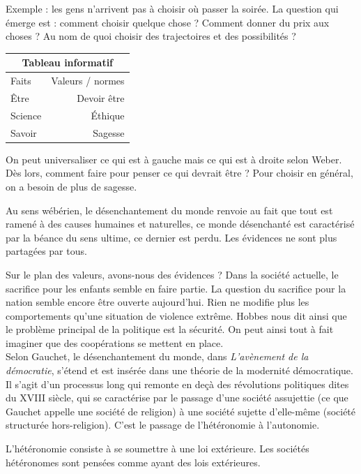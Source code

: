 \documentclass[a4paper,11pt]{article}
\begin{document}
	Exemple : les gens n’arrivent pas à choisir où passer la soirée. La question qui émerge est : comment choisir quelque chose ? Comment donner du prix aux choses ? Au nom de quoi choisir des trajectoires et des possibilités ?

	\vspace{0.3cm}
	\begin{tabular}{lr}
	\multicolumn{2}{c}{Tableau informatif} \\
	\hline
	Faits & Valeurs / normes \\
	Être & Devoir être \\
	Science & Éthique \\
	Savoir & Sagesse
	\end{tabular}
	\vspace{0.3cm}

	On peut universaliser ce qui est à gauche mais ce qui est à droite selon Weber. Dès lors, comment faire pour penser ce qui devrait être ? Pour choisir en général, on a besoin de plus de sagesse.
	
	Au sens wébérien, le désenchantement du monde renvoie au fait que tout est ramené à des causes humaines et naturelles, ce monde désenchanté est caractérisé par la béance du sens ultime, ce dernier est perdu. Les évidences ne sont plus partagées par tous.
	
	Sur le plan des valeurs, avons-nous des évidences ? Dans la société actuelle, le sacrifice pour les enfants semble en faire partie.
	La question du sacrifice pour la nation semble encore être ouverte aujourd’hui.
	Rien ne modifie plus les comportements qu’une situation de violence extrême. Hobbes nous dit ainsi que le problème principal de la politique est la sécurité.
	On peut ainsi tout à fait imaginer que des coopérations se mettent en place.\\
	
	Selon Gauchet, le désenchantement du monde, dans \textit{L’avènement de la démocratie}, s’étend et est insérée dans une théorie de la modernité démocratique. Il s’agit d’un processus long qui remonte en deçà des révolutions politiques dites du XVIII siècle, qui se caractérise par le passage d’une société assujettie (ce que Gauchet appelle une société de religion) à une société sujette d’elle-même (société structurée hors-religion). C’est le passage de l’hétéronomie à l’autonomie.
	
	L’hétéronomie consiste à se soumettre à une loi extérieure.
	Les sociétés hétéronomes sont pensées comme ayant des lois extérieures.
	
\end{document}
